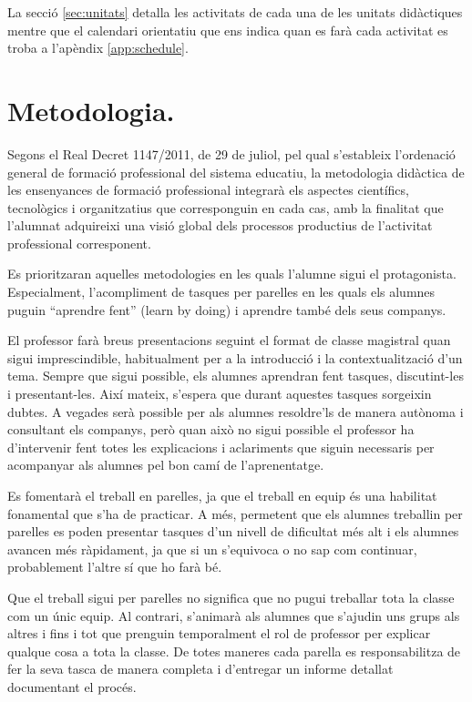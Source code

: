 \documentclass[catalan, a4paper, 12pt, titlepage]{article}
\begin{document}
La secció \ref{sec:unitats} detalla les activitats de cada una de les unitats didàctiques mentre que el calendari orientatiu que ens indica quan es farà cada activitat es troba a l'apèndix \ref{app:schedule}.

\section{Metodologia.}
\label{sec:metodologia}

Segons el Real Decret 1147/2011, de 29 de juliol, pel qual s'estableix l'ordenació general de formació professional del sistema educatiu, la metodologia didàctica de les ensenyances de formació professional integrarà els aspectes científics, tecnològics i organitzatius que corresponguin en cada cas, amb la finalitat que l'alumnat adquireixi una visió global dels processos productius de l'activitat professional corresponent.

Es prioritzaran aquelles metodologies en les quals l'alumne sigui el protagonista. Especialment, l'acompliment de tasques per parelles en les quals els alumnes puguin ``aprendre fent'' (learn by doing) i aprendre també dels seus companys.

El professor farà breus presentacions seguint el format de classe magistral quan sigui imprescindible, habitualment per a la introducció i la contextualització d'un tema.
Sempre que sigui possible, els alumnes aprendran fent tasques, discutint-les i presentant-les.
Així mateix, s'espera que durant aquestes tasques sorgeixin dubtes. 
A vegades serà possible per als alumnes resoldre'ls de manera autònoma i consultant els companys, però quan això no sigui possible el professor ha d'intervenir fent totes les explicacions i aclariments que siguin necessaris per acompanyar als alumnes pel bon camí de l'aprenentatge.

Es fomentarà el treball en parelles, ja que el treball en equip és una habilitat fonamental que s'ha de practicar.
A més, permetent que els alumnes treballin per parelles es poden presentar tasques d'un nivell de dificultat més alt i els alumnes avancen més ràpidament, ja que si un s'equivoca o no sap com continuar, probablement l'altre sí que ho farà bé.

Que el treball sigui per parelles no significa que no pugui treballar tota la classe com un únic equip.
Al contrari, s'animarà als alumnes que s'ajudin uns grups als altres i fins i tot que prenguin temporalment el rol de professor per explicar qualque cosa a tota la classe.
De totes maneres cada parella es responsabilitza de fer la seva tasca de manera completa i d'entregar un informe detallat documentant el procés.
\end{document}
